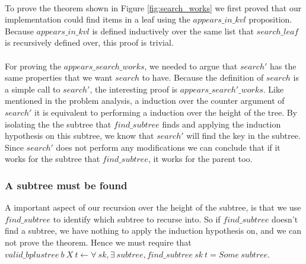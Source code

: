 \paragraph{}
To prove the theorem shown in Figure \ref{fig:search_works} we first proved that our implementation could find items in a leaf using the $appears\_in\_kvl$ proposition. Because $appears\_in\_kvl$ is defined inductively over the same list that $search\_leaf$ is recursively defined over, this proof is trivial.

\paragraph{}
For proving the $appears\_search\_works$, we needed to argue that $search'$ has the same properties that we want $search$ to have. Because the definition of $search$ is a simple call to $search'$, the interesting proof is $appears\_search'\_works$. Like mentioned in the problem analysis, a induction over the counter argument of $search'$ it is equivalent to performing a induction over the height of the tree. By isolating the the subtree that $find\_subtree$ finds and applying the induction hypothesis on this subtree, we know that $search'$ will find the key in the subtree. Since $search'$ does not perform any modifications we can conclude that if it works for the subtree that $find\_subtree$, it works for the parent too. 

\subsubsection{A subtree must be found}
A important aspect of our recursion over the height of the subtree, is that we use $find\_subtree$ to identify which subtree to recurse into. So if $find\_subtree$ doesn't find a subtree, we have nothing to apply the induction hypothesis on, and we can not prove the theorem. Hence we must require that
$valid\_bplustree~b~X~t \leftarrow \forall~sk, \exists~subtree, find\_subtree~ sk~t = Some~subtree$.

